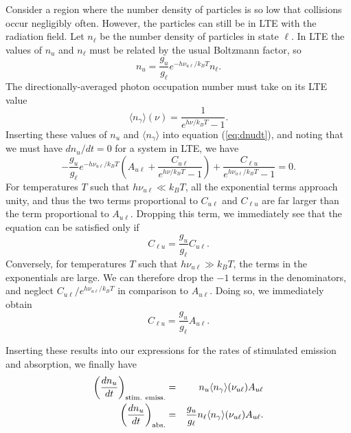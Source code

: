 Consider a region where the number density of particles is so low that collisions occur negligibly often. However, the particles can still be in LTE with the radiation field. Let $n_\ell$ be the number density of particles in state $\ell$. In LTE the values of $n_u$ and $n_\ell$ must be related by the usual Boltzmann factor, so
\begin{equation}
n_u = \frac{g_u}{g_\ell} e^{-h\nu_{u\ell}/k_B T} n_\ell.
\end{equation}
The directionally-averaged photon occupation number must take on its LTE value
\begin{equation}
\label{eq:ngamma_avg_LTE}
\langle n_\gamma\rangle(\nu) = \frac{1}{e^{h\nu/k_B T} - 1}.
\end{equation}
Inserting these values of $n_u$ and $\langle n_\gamma\rangle$ into equation (\ref{eq:dnudt}), and noting that we must have $dn_u/dt = 0$ for a system in LTE, we have
\begin{equation}
-\frac{g_u}{g_\ell} e^{-h\nu_{u\ell}/k_B T} \left(A_{u\ell} + \frac{C_{u\ell}}{e^{h\nu/k_B T} - 1}\right) + \frac{C_{\ell u} }{e^{h\nu_{u\ell}/k_B T} - 1} = 0.
\end{equation}
For temperatures $T$ such that $h\nu_{u\ell} \ll k_B T$, all the exponential terms approach unity, and thus the two terms proportional to $C_{u\ell}$ and $C_{\ell u}$ are far larger than the term proportional to $A_{u\ell}$. Dropping this term, we immediately see that the equation can be satisfied only if
\begin{equation}
C_{\ell u} = \frac{g_u}{g_\ell} C_{u\ell}.
\end{equation} Conversely, for temperatures $T$ such that $h\nu_{u\ell} \gg k_B T$, the terms in the exponentials are large. We can therefore drop the $-1$ terms in the denominators, and neglect $C_{u\ell}/e^{h\nu_{u\ell}/k_B T}$ in comparison to $A_{u\ell}$. Doing so, we immediately obtain
\begin{equation}
C_{\ell u} = \frac{g_u}{g_\ell} A_{u\ell}.
\end{equation}

Inserting these results into our expressions for the rates of stimulated emission and absorption, we finally have
\begin{eqnarray}
\left(\frac{dn_u}{dt}\right)_{\rm stim.~emiss.} & = & n_u \langle n_\gamma\rangle(\nu_{u\ell}) A_{u\ell} \\
\left(\frac{dn_u}{dt}\right)_{\rm abs.} & = & \frac{g_u}{g_\ell} n_\ell \langle n_\gamma\rangle(\nu_{u\ell}) A_{u\ell}.
\end{eqnarray}


